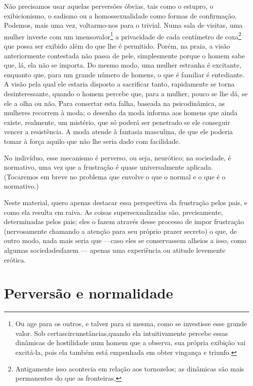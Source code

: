 Não precisamos usar aquelas perversões óbvias, tais como o estupro,
o exibicionismo, o sadismo ou a homossexualidade como formas de
confirmação. Podemos, mais uma vez, voltarmo-nos para o trivial. Numa
sala de visitas, uma mulher investe com um imenso\idxvoysad[|)] valor\footnote{ Ou
age para os outros, e talvez para si mesma, como se investisse esse
grande valor. Sob certas\idxsadivoye[|nn] circunstâncias,\idxvoysad[|nn] quando ela intuitivamente
percebe essas dinâmicas de hostilidade num homem que a observa, sua
própria exibição vai excitá-la, pois ela também está empenhada em obter
vingança e triunfo.} a privacidade de cada centímetro de coxa\footnote{ Antigamente
isso acontecia em relação aos tornozelos; as
dinâmicas são mais permanentes do que as fronteiras.} que
possa ser exibido além do que lhe é permitido. Porém, na praia, a visão
anteriormente contestada não passa de pele, simplesmente porque o homem
sabe que, lá, ela não se importa. Do mesmo modo, uma mulher estranha é
excitante, enquanto que, para um grande número de homens, o que é
familiar é entediante. A visão pela qual ele estaria disposto a
sacrificar tanto, rapidamente se torna desinteressante, quando o homem
percebe que, para a mulher,\idxsexuo{} pouco se lhe dá, se ele a olha ou não. Para
consertar esta falha, baseada na psicodinâmica, as mulheres recorrem à
moda; o desenho da moda informa aos homens que ainda existe, realmente,
um mistério, que só poderá ser penetrado se ele conseguir vencer a
resistência. A moda atende à fantasia masculina,\idxinfanolhar{} de que ele poderia
tomar à força aquilo\idxmistolh{} que não lhe seria dado com facilidade.

No indivíduo, esse mecanismo é perverso, ou seja, neurótico; na
sociedade, é normativo, uma vez que a frustração é quase universalmente
aplicada. (Tocaremos em breve no problema que envolve o que o normal e
o que é o normativo.)

Neste material, quero apenas destacar essa perspectiva da frustração
pelos pais, e como ela resulta em raiva. As coisas\idxroup{} supersexualizadas
são, precisamente, determinadas pelos pais; eles o fazem através desse
processo de impor frustração (nervosamente chamando a atenção para seu
próprio prazer secreto) o que, de outro modo, nada mais seria que ---\idxsexuamis[|)]
caso eles se conservassem alheios a isso, como algumas sociedades\idxpervmiste[|)]
fazem --- apenas uma experiência ou atitude levemente erótica.



\section{Perversão e normalidade}

